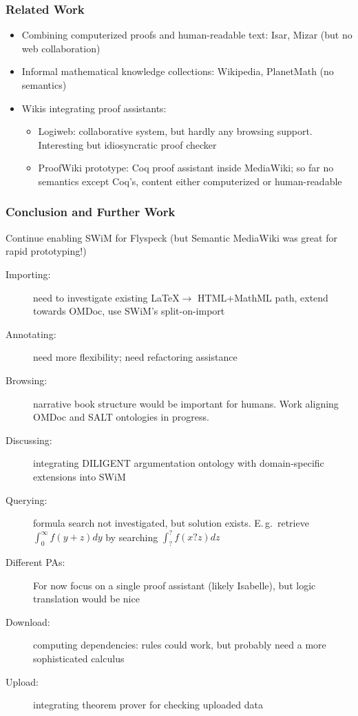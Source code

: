 \documentclass[pdftex]{beamer}
\begin{document}
\begin{frame}
  \frametitle{Related Work}
  \begin{itemize}
  \item Combining computerized proofs and human-readable text: Isar, Mizar (but
    no web collaboration)
  \item Informal mathematical knowledge collections: Wikipedia, PlanetMath (no
    semantics)
  \item Wikis integrating proof assistants:
    \begin{itemize}
    \item Logiweb: collaborative system, but hardly any browsing support.
      Interesting but idiosyncratic proof checker
    \item ProofWiki prototype: Coq proof assistant inside MediaWiki; so far no
      semantics except Coq's, content either computerized or human-readable
    \end{itemize}
  \end{itemize}
\end{frame}

\begin{frame}
  \frametitle{Conclusion and Further Work}
  Continue enabling SWiM for Flyspeck (but Semantic MediaWiki was great
    for rapid prototyping!)
  \begin{description}
  \item[Importing:] need to investigate existing \LaTeX $\to$ HTML+MathML path,
    extend towards OMDoc, use SWiM's split-on-import
  \item[Annotating:] need more flexibility; need refactoring assistance
  \item[Browsing:] narrative book structure would be important for humans.  Work
    aligning OMDoc and SALT ontologies in progress.
  \item[Discussing:] integrating DILIGENT argumentation ontology with
    domain-specific extensions into SWiM
  \item[Querying:] formula search not investigated, but solution exists.
    E.\,g.\ retrieve $\int_0^\infty f(y+z)dy$ by searching $\int_?^? f(x ? z)dz$
  \item[Different PAs:] For now focus on a single proof assistant (likely
    Isabelle), but logic translation would be nice
  \item[Download:] computing dependencies: rules could work, but probably need a
    more sophisticated calculus
  \item[Upload:] integrating theorem prover for checking uploaded data
  \end{description}
\end{frame}
\end{document}
